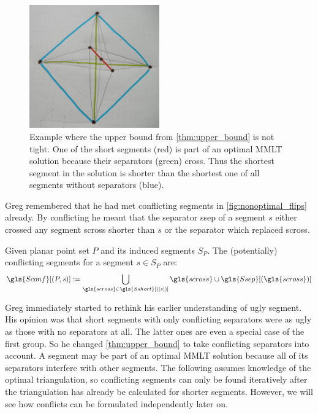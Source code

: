 \begin{figure}[ht]
  \centering
  \includegraphics[width=0.5\textwidth]{img/upper_bound_tightness.jpg}
  \caption{
    \label{fig:upper_bound_tightness}
    Example where the upper bound from \cref{thm:upper_bound} is not 
    tight. One of the short segments (red) is part of an optimal 
    \gls{MMLT} solution because their separators (green) cross. Thus
    the shortest segment in the solution is shorter than the shortest
    one of all segments without separators (blue).
  }
\end{figure}  

Greg remembered that he had met conflicting segments in 
\cref{fig:nonoptimal_flips} already. By conflicting he meant that the
separator \gls{ssep} of a segment \(s\) either crossed any segment
\gls{scross} shorter than \(s\) or the separator which replaced
\gls{scross}. 


\begin{definition}\label{def:conflicting_segments}
  Given planar point set \(P\) and its induced segments \(S_P\). The
  (potentially) conflicting segments for a segment \(s \in S_P\) are:
  \[
    \gls{Sconf}[(P,s)] :=
      \bigcup_{\gls{scross} \in \gls{Sshort}[(|s|)]}
      \gls{scross} \cup \gls{Ssep}[(\gls{scross})]
  \]
\end{definition}

Greg immediately started to rethink his earlier understanding of ugly
segment. His opinion was that short segments with only conflicting
separators were as ugly as those with no separators at all. The latter
ones are even a special case of the first group. So he changed
\cref{thm:upper_bound} to take conflicting separators into account. A 
segment may be part of an optimal \gls{MMLT} solution because all of
its separators interfere with other segments. The following
assumes knowledge of the optimal triangulation, so conflicting segments 
can only be found iteratively after the triangulation has already be 
calculated for shorter segments. However, we will see how conflicts can 
be formulated independently later on.

